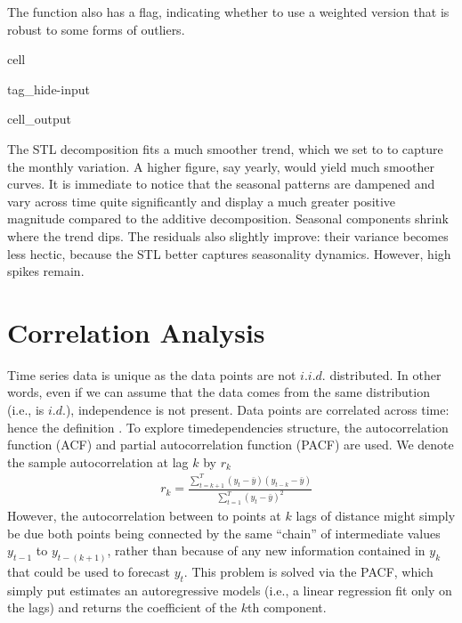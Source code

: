 \documentclass[letterpaper,10pt,english]{jupyterBook}
\begin{document}
\sphinxAtStartPar
The function also has a  flag, indicating whether to use a weighted version that is robust to some forms of outliers.

\begin{sphinxuseclass}{cell}
\begin{sphinxuseclass}{tag_hide-input}
\begin{sphinxuseclass}{cell_output}
\noindent{}

\end{sphinxuseclass}
\end{sphinxuseclass}
\end{sphinxuseclass}
\sphinxAtStartPar
The STL decomposition fits a much smoother trend, which we set to  to capture the monthly variation. A higher figure, say yearly, would yield much smoother curves. It is immediate to notice that the seasonal patterns are dampened and vary across time quite significantly and display a much greater positive magnitude compared to the additive decomposition. Seasonal components shrink where the trend dips. The residuals also slightly improve: their variance becomes less hectic, because the STL better captures seasonality dynamics. However, high spikes remain.


\section{Correlation Analysis}
\label{\detokenize{05-time_series_analysis:correlation-analysis}}
\sphinxAtStartPar
Time series data is unique as the data points are not \(i.i.d.\) distributed. In other words, even if we can assume that the data comes from the same distribution (i.e., is \(i.d.\)), independence is not present. Data points are correlated across time: hence the definition . To explore time\sphinxhyphen{}dependencies structure, the auto\sphinxhyphen{}correlation function (ACF) and partial auto\sphinxhyphen{}correlation function (PACF) are used. We denote the sample autocorrelation at lag \(k\) by \(r_k\)
\label{equation:05-time_series_analysis:3e5a264e-c75f-4993-b3b3-9ecc4ae298f3}\begin{align}
&r_k = \frac{\sum_{t=k+1}^T (y_t-\bar{y})(y_{t-k}-\bar{y})}{\sum_{t=1}^T (y_t-\bar{y})^2}
\end{align}
\sphinxAtStartPar
However, the autocorrelation between to points at \(k\) lags of distance might simply be due both points being connected by the same “chain” of intermediate values \(y_{t-1}\) to \(y_{t-(k+1)}\), rather than because of any new information contained in  \(y_k\)  that could be used to forecast \(y_t\). This problem is solved via the PACF, which \sphinxhyphen{} simply put \sphinxhyphen{} estimates an autoregressive models (i.e., a linear regression fit only on the lags) and returns the coefficient of the \(k\)th component.
\end{document}
